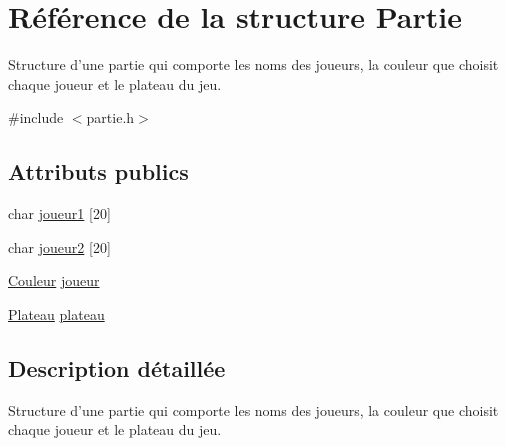 \hypertarget{structPartie}{\section{\-Référence de la structure \-Partie}
\label{structPartie}
}


\-Structure d'une partie qui comporte les noms des joueurs, la couleur que choisit chaque joueur et le plateau du jeu.  




{\ttfamily \#include $<$partie.\-h$>$}

\subsection*{\-Attributs publics}
\begin{DoxyCompactItemize}
\item 
char \hyperlink{structPartie_a42905bbdce5ccfd367a1b4195a433e01}{joueur1} \mbox{[}20\mbox{]}
\item 
char \hyperlink{structPartie_a90dd0f2162050b2f3169dcb860d975cf}{joueur2} \mbox{[}20\mbox{]}
\item 
\hyperlink{couleur_8h_aa304d0ca681f782b1d7735da33037dd7}{\-Couleur} \hyperlink{structPartie_a8b5c0c007da53d6d723f4300a1d9d4ad}{joueur}
\item 
\hyperlink{plateau_8h_a2f8eb6e8895bd97048918153353c99ac}{\-Plateau} \hyperlink{structPartie_ae8a9b67f286f8bfd3e3a574f0ac2ac67}{plateau}
\end{DoxyCompactItemize}


\subsection{\-Description détaillée}
\-Structure d'une partie qui comporte les noms des joueurs, la couleur que choisit chaque joueur et le plateau du jeu. 

